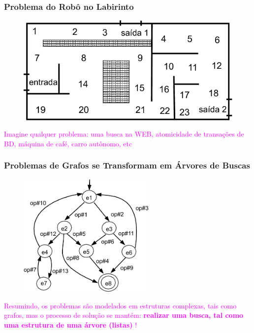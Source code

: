 \begin{frame}[fragile]
\frametitle{Problema do Robô no Labirinto}

\begin{figure}[!htb]
\centering
\includegraphics[width=.79\textwidth, height=0.45\textheight]{figures/labirinto_robo.png}
\end{figure}

\textcolor{magenta}{Imagine qualquer problema: uma busca na WEB,
atomicidade de transações de BD, máquina de café, carro autônomo, etc }

\end{frame}



\begin{frame}[fragile]
\frametitle{Problemas de Grafos se Transformam em Árvores de Buscas}

\begin{figure}[!htb]
\centering
\includegraphics[width=0.6\textwidth, height=0.55\textheight]{figures/arv_buscas_estados.png}
\end{figure}

\textcolor{magenta}{Resumindo, os problemas são modelados  em 
estruturas  complexas, tais como grafos, mas o processo de solução
se mantém: \textbf{realizar uma busca, tal como uma estrutura de uma árvore (listas)} !}

\end{frame}




